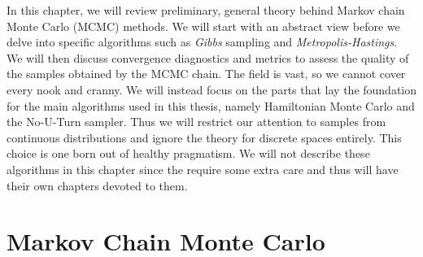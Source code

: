 In this chapter, we will review preliminary, general theory behind Markov chain Monte Carlo (MCMC) methods. We will start with an abstract view before we delve into
specific algorithms such as \textit{Gibbs} sampling and \textit{Metropolis-Hastings}. We will then discuss convergence diagnostics and metrics to assess the
quality of the samples obtained by the MCMC chain. The field is vast, so we cannot cover every nook and cranny. We will instead
focus on the parts that lay the foundation for the main algorithms used in this thesis, namely Hamiltonian Monte Carlo and the No-U-Turn sampler. 
Thus we will restrict our attention to samples from continuous distributions and ignore the theory for discrete spaces entirely.
This choice is one born out of healthy pragmatism.
We will not describe these algorithms in this chapter since the require some extra care and thus will have their own chapters devoted to them.

\section{Markov Chain Monte Carlo}\label{sec:mcmc}
\begin{comment}
  The treatment of Markov chains largely follows the presentation in \cite{markov_chains}. A Markov process is a scheme that from a given state (or value) $\mu$ generates a new state $\nu$ with a \textit{transition} probability $T(\nu|\mu)$. A Markov process has the following properties
\begin{itemize}
  \item The transition probabilities $T(\nu|\mu)$ are time-independent.
  \item $T(\nu|\mu)$ only depend on the states $\mu$ and $\nu$.
  \item The transition $\mu \to \mu$ is allowed, thus $T(\mu|\mu) > 0$. Hence, the new generated state may just be the same as the previous state.
  \item The transition probabilties must sum to unity, hence $\int_{\nu} T(\nu|\mu) = 1$. In other words, the procedure must generate some new state.
\end{itemize}

Two important principles, originally found by Metropolis et. al \cite{metropolis}, were introduced to make the MCMC chains computationally feasible. 
\begin{enumerate}
  \item \textbf{Ergodicity}: Any state $\nu$ can be reached from any other state $\mu$ given a long enough MCMC chain.
  \item \textbf{Detailed balance}: If the transition probabilities $T(\nu|\mu)$ obey the detailed balance equation, $$P(\mu)T(\nu|\mu) = P(\nu)T(\mu|\nu),$$
      then the Markov chain is guaranteed to be ergodic. The interpretation of this is that on average, the system makes the transition $\mu \to \nu$ just as often as the transition $\nu \to \mu$.
\end{enumerate}
\end{comment}

